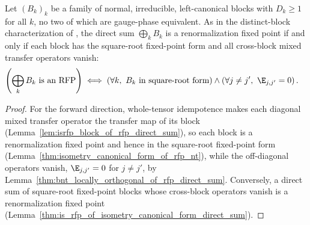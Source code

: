 \begin{lemma}%
    \label{thm:rfp_directSumTensor_iff}
    \leanok
    Let $(B_k)_k$ be a family of normal, irreducible, left-canonical blocks with
    $D_k\ge1$ for all $k$, no two of which are gauge-phase equivalent. As in
    the distinct-block characterization of
    \cite[Theorem~3.11]{Cirac2016MPDO_arXiv}, the direct sum $\bigoplus_k B_k$
    is a renormalization fixed point if and only if each block has the
    square-root fixed-point form and all cross-block mixed transfer operators
    vanish:
    \begin{align}
        \left(\bigoplus_k B_k\text{ is an RFP}\right)
         & \iff
        \left(\forall k,\ B_k\text{ in square-root form}\right)
        \wedge
        \left(\forall j\ne j',\ \E_{j,j'}=0\right).
        \notag
    \end{align}
\end{lemma}
\begin{proof}\leanok
    For the forward direction, whole-tensor idempotence makes each diagonal mixed
    transfer operator the transfer map of its block
    (Lemma~\ref{lem:isrfp_block_of_rfp_direct_sum}), so each block is a
    renormalization fixed point and hence in the square-root fixed-point form
    (Lemma~\ref{thm:isometry_canonical_form_of_rfp_nt}), while the off-diagonal
    operators vanish, $\E_{j,j'}=0$ for $j\ne j'$, by
    Lemma~\ref{thm:bnt_locally_orthogonal_of_rfp_direct_sum}. Conversely, a
    direct sum of square-root fixed-point blocks whose cross-block operators
    vanish is a renormalization fixed point
    (Lemma~\ref{thm:is_rfp_of_isometry_canonical_form_direct_sum}).
\end{proof}

